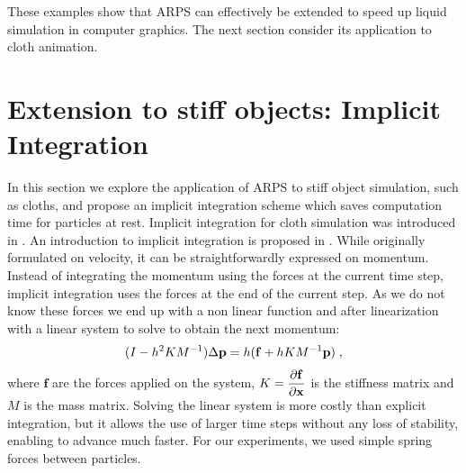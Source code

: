 These examples show that ARPS can effectively be extended to speed up liquid simulation in computer graphics. The next section consider its application to cloth animation.

\section{Extension to stiff objects: Implicit Integration} 
\label{sec:arps_implicit}
In this section we explore the application of ARPS to stiff object simulation, such as cloths, and propose an implicit integration scheme which saves computation time for particles at rest.
Implicit integration for cloth simulation was introduced in \cite{Baraff1998}. 
An introduction to implicit integration is proposed in \cite{Witkin2001}.
While originally formulated on velocity, it can be straightforwardly expressed on momentum.
Instead of integrating the momentum using the forces at the current time step, implicit integration uses the forces at the end of the current step.
As we do not know these forces we end up with a non linear function and after linearization with a linear system to solve to obtain the next momentum:
\begin{equation}
    \label{eq:implicit}
    ( I -h^{2}KM^{-1} ) \Delta \mathbf{p} = h( \mathbf{f} + h KM^{-1}\mathbf{p} ) \;,
\end{equation}
where $\mathbf{f}$ are the forces applied on the system, $\displaystyle K = \frac{\partial \mathbf{f}}{ \partial \mathbf{x}}$ is the stiffness matrix and $M$ is the mass matrix. 
Solving the linear system is more costly than explicit integration, but it allows the use of larger time steps without any loss of stability, enabling to advance much faster.
For our experiments, we used simple spring forces between particles.
